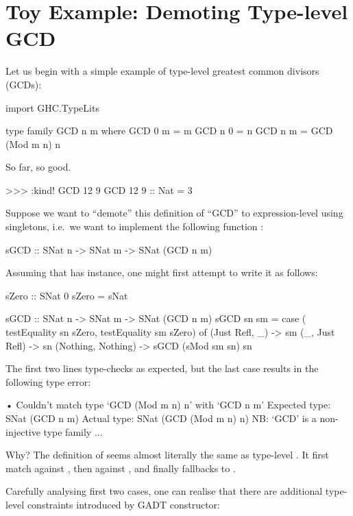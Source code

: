 \documentclass[demotion-paper.tex]{subfiles}
\begin{document}
\section{Toy Example: Demoting Type-level GCD}
\label{sec:gcd}
Let us begin with a simple example of type-level greatest common divisors (GCDs):

\begin{code}
import GHC.TypeLits

type family GCD n m where
  GCD 0 m = m
  GCD n 0 = n
  GCD n m = GCD (Mod m n) n
\end{code}

So far, so good.

\begin{repl}
>>> :kind! GCD 12 9
GCD 12 9 :: Nat
= 3
\end{repl}

Suppose we want to ``demote'' this definition of ``GCD'' to expression-level using singletons, i.e.\ we want to implement the following function :

\begin{code}
sGCD :: SNat n -> SNat m -> SNat (GCD n m)
\end{code}

Assuming that  has  instance, one might first attempt to write it as follows:

\begin{code}
sZero :: SNat 0
sZero = sNat

sGCD :: SNat n -> SNat m -> SNat (GCD n m)
sGCD sn sm =
  case ( testEquality sn sZero, 
         testEquality sm sZero) of
    (Just Refl, _) -> sm
    (_, Just Refl) -> sn
    (Nothing, Nothing) -> sGCD (sMod sm sn) sn
\end{code}

The first two lines type-checks as expected, but the last case results in the following type error:

\begin{repl}
• Couldn't match type ‘GCD (Mod m n) n’
  with ‘GCD n m’
  Expected type: SNat (GCD n m)
    Actual type: SNat (GCD (Mod m n) n)
  NB: ‘GCD’ is a non-injective type family
  ...
\end{repl}

Why? The definition of  seems almost literally the same as type-level .
It first match  against , then  against , and finally fallbacks to .

Carefully analysing first two cases, one can realise that there are additional type-level constraints introduced by  GADT constructor:
\end{document}
